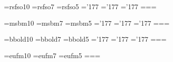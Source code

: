 

\let\knuthcases=\cases
\let\knuthproclaim=\proclaim
\let\knuthS=\S
\let\sectionsym=\knuthS
\def\sections{\sectionsym\sectionsym}
\let\footnotebeforeamstex=\footnote

\let\footnote=\footnotebeforeamstex
\let\footnotebeforeamstex\relax
\loadmsam %
\loadmsbm %
\loadbold %
\loadeufm %
\let\AMSproclaim=\proclaim
\let\proclaim\relax




\def\fomenc{AMS}
\setsimplemath

\font\tenscr=rsfso10
\font\sevenscr=rsfso7
\font\fivescr=rsfso5
\skewchar\tenscr='177 \skewchar\sevenscr='177 \skewchar\fivescr='177
\newfam\scrfam \textfont\scrfam=\tenscr \scriptfont\scrfam=\sevenscr \scriptscriptfont\scrfam=\fivescr
\def\scr#1{{\fam\scrfam#1}}

\font\tenbbb=msbm10
\font\sevenbbb=msbm7
\font\fivebbb=msbm5
\skewchar\tenbbb='177 \skewchar\sevenbbb='177 \skewchar\fivebbb='177
\newfam\bbbfam \textfont\bbbfam=\tenbbb \scriptfont\bbbfam=\sevenbbb \scriptscriptfont\bbbfam=\fivebbb
\def\bbb#1{{\fam\bbbfam\relax#1}}

\font\tenbbold=bbold10
\font\sevenbbold=bbold7
\font\fivebbold=bbold5
\skewchar\tenbbold='177 \skewchar\sevenbbold='177 \skewchar\fivebbold='177
\newfam\bboldfam \textfont\bboldfam=\tenbbold \scriptfont\bboldfam=\sevenbbold \scriptscriptfont\bboldfam=\fivebbold
\def\bbold#1{{\fam\bboldfam\relax#1}}

\font\teneuf=eufm10
\font\seveneuf=eufm7
\font\fiveeuf=eufm5
\newfam\euffam \textfont\euffam=\teneuf \scriptfont\euffam=\seveneuf \scriptscriptfont\euffam=\fiveeuf
\def\euf#1{{\fam\euffam#1}}


